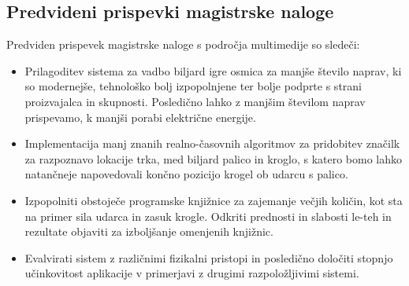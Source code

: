 \documentclass[a4paper, 12pt]{article}
\begin{document}
\subsection{Predvideni prispevki magistrske naloge}
Predviden prispevek magistrske naloge s področja multimedije so sledeči:
\begin{itemize}
    \item Prilagoditev sistema za vadbo biljard igre osmica za manjše število naprav, ki so modernejše, tehnološko bolj izpopolnjene ter bolje podprte s strani proizvajalca in skupnosti. Posledično lahko z manjšim številom naprav prispevamo, k manjši porabi električne energije.
    \item Implementacija manj znanih realno-časovnih algoritmov za pridobitev značilk za razpoznavo lokacije trka, med biljard palico in kroglo, s katero bomo lahko natančneje napovedovali končno pozicijo krogel ob udarcu s palico.
    \item Izpopolniti obstoječe programske knjižnice za zajemanje večjih količin, kot sta na primer sila udarca in zasuk krogle. Odkriti prednosti in slabosti le-teh in rezultate objaviti za izboljšanje omenjenih knjižnic.
    \item Evalvirati sistem z različnimi fizikalni pristopi in posledično določiti stopnjo učinkovitost aplikacije v primerjavi z drugimi razpoložljivimi sistemi.
\end{itemize}
\end{document}
